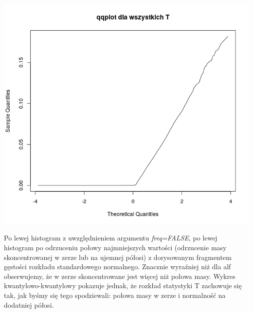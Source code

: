 \documentclass[a4paper,11pt]{article}
\begin{document}
\includegraphics[scale=.3]{Rplot102.png} 

Po lewej histogram z uwzględnieniem argumentu \textit{freq=FALSE}, po lewej histogram po odrzuceniu połowy najmniejszych wartości (odrzucenie masy skoncentrowanej w zerze lub na ujemnej półosi) z dorysowanym fragmentem gęstości rozkładu standardowego normalnego. Znacznie wyraźniej niż dla alf obserwujemy, że w zerze skoncentrowane jest więcej niż połowa masy. Wykres kwantylowo-kwantylowy pokazuje jednak, że rozkład statystyki T zachowuje się tak, jak byśmy się tego spodziewali: połowa masy w zerze i normalność na dodatniej półosi.
\end{document}
